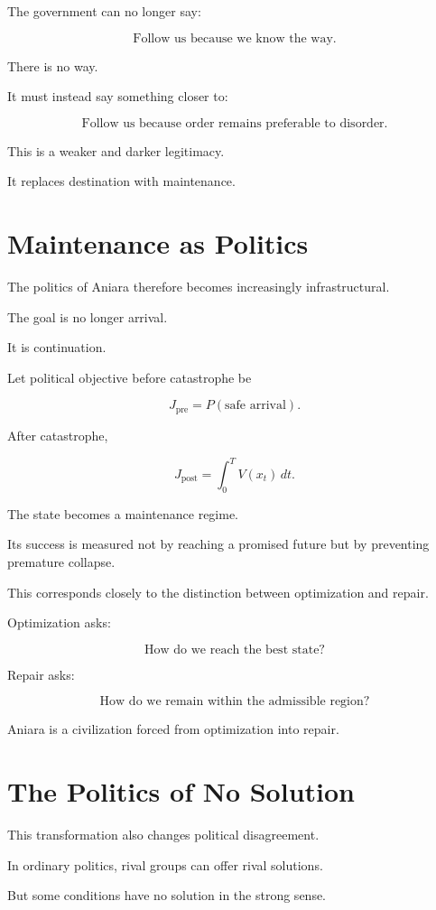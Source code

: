 \documentclass[11pt,oneside]{book}
\theoremstyle{definition}
\theoremstyle{remark}
\begin{document}
The government can no longer say:

\[
\text{Follow us because we know the way.}
\]

There is no way.

It must instead say something closer to:

\[
\text{Follow us because order remains preferable to disorder.}
\]

This is a weaker and darker legitimacy.

It replaces destination with maintenance.

\section{Maintenance as Politics}

The politics of Aniara therefore becomes increasingly infrastructural.

The goal is no longer arrival.

It is continuation.

Let political objective before catastrophe be

\[
J_{\mathrm{pre}}
=
P(\text{safe arrival}).
\]

After catastrophe,

\[
J_{\mathrm{post}}
=
\int_0^T
V(x_t)\,dt.
\]

The state becomes a maintenance regime.

Its success is measured not by reaching a promised future but by preventing premature collapse.

This corresponds closely to the distinction between optimization and repair.

Optimization asks:

\[
\text{How do we reach the best state?}
\]

Repair asks:

\[
\text{How do we remain within the admissible region?}
\]

Aniara is a civilization forced from optimization into repair.

\section{The Politics of No Solution}

This transformation also changes political disagreement.

In ordinary politics, rival groups can offer rival solutions.

But some conditions have no solution in the strong sense.
\end{document}
